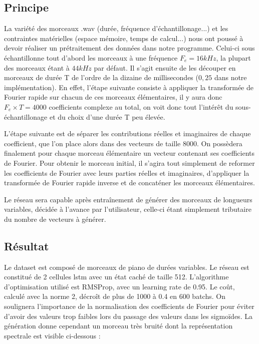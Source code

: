 \subsection{Principe}
La variété des morceaux .wav (durée, fréquence d'échantillonage...) et les contraintes matérielles (espace mémoire, temps de calcul...) nous ont poussé à devoir réaliser un prétraitement des données dans notre programme. Celui-ci sous échantillonne tout d'abord les morceaux à une fréquence $F_e = 16kHz$, la plupart des morceaux étant à $44kHz$ par défaut. Il s'agit ensuite de les découper en morceaux de durée T de l'ordre de la dizaine de millisecondes ($0,25$ dans notre implémentation). En effet, l'étape suivante consiste à appliquer la transformée de Fourier rapide sur chacun de ces morceaux élémentaires, il y aura donc $F_e \times T = 4000$ coefficients complexe au total, on voit donc tout l'intérêt du sous-échantillonage et du choix d'une durée T peu élevée. 

L'étape suivante est de séparer les contributions réelles et imaginaires de chaque coefficient, que l'on place alors dans des vecteurs de taille 8000. On possèdera finalement pour chaque morceau élémentaire un vecteur contenant ses coefficients de Fourier. Pour obtenir le morceau initial, il s'agira tout simplement de reformer les coefficients de Fourier avec leurs parties réelles et imaginaires, d'appliquer la transformée de Fourier rapide inverse et de concaténer les morceaux élémentaires.

Le réseau sera capable après entraînement de générer des morceaux de longueurs variables, décidée à l'avance par l'utilisateur, celle-ci étant simplement tributaire du nombre de vecteurs à générer.

\subsection{Résultat}

Le dataset est composé de morceaux de piano de durées variables. Le réseau est constitué de 2 cellules lstm avec un état caché de taille 512. L'algorithme d'optimisation utilisé est RMSProp, avec un learning rate de 0.95. Le coût, calculé avec la norme 2, décroît de plus de 1000 à 0.4 en 600 batchs. On soulignera l'importance de la normalisation des coefficients de Fourier pour éviter d'avoir des valeurs trop faibles lors du passage des valeurs dans les sigmoïdes.
La génération donne cependant un morceau très bruité dont la représentation spectrale est visible ci-dessous :

